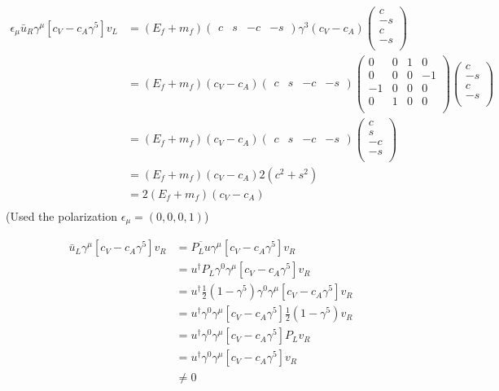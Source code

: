 \begin{align*}
   \epsilon_\mu \bar{u}_R \gamma^\mu [c_V - c_A \gamma^5]v_L &= (E_f+m_f)\begin{pmatrix}
        c & s & -c & -s
    \end{pmatrix} \gamma^3 (c_V - c_A)\begin{pmatrix}
        c \\ -s \\ c \\ -s \\
    \end{pmatrix} \\
    &= (E_f+m_f)(c_V - c_A)\begin{pmatrix}
        c & s & -c & -s
    \end{pmatrix} \begin{pmatrix}
        0 & 0 & 1 & 0 \\
        0 & 0 & 0 & -1 \\
        -1 & 0 & 0 & 0 \\
        0 & 1 & 0 & 0 \\
    \end{pmatrix} \begin{pmatrix}
        c \\ -s \\ c \\ -s \\
    \end{pmatrix} \\
    &= (E_f+m_f)(c_V - c_A)\begin{pmatrix}
        c & s & -c & -s
    \end{pmatrix} \begin{pmatrix}
        c \\
        s \\
        -c \\
        -s \\
    \end{pmatrix} \\
    &= (E_f+m_f)(c_V - c_A)2(c^2 + s^2) \\
    &= 2(E_f+m_f)(c_V - c_A) \\
\end{align*}
(Used the polarization $\epsilon_\mu = (0,0,0,1)$)


\begin{align*}
    \bar{u}_L \gamma^\mu [c_V - c_A \gamma^5]v_R &= \overline{P_L u} \gamma^\mu [c_V - c_A \gamma^5]v_R \\
    &= u^\dagger P_L \gamma^0 \gamma^\mu [c_V - c_A \gamma^5]v_R \\
    &= u^\dagger \frac{1}{2}(1 - \gamma^5) \gamma^0 \gamma^\mu [c_V - c_A \gamma^5] v_R \\
    &= u^\dagger \gamma^0 \gamma^\mu [c_V - c_A \gamma^5]\frac{1}{2}(1 - \gamma^5) v_R \\
    &= u^\dagger \gamma^0 \gamma^\mu [c_V - c_A \gamma^5]P_L v_R \\
    &= u^\dagger \gamma^0 \gamma^\mu [c_V - c_A \gamma^5]v_R \\
    &\neq 0
\end{align*}


